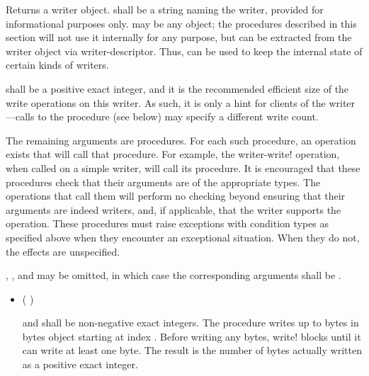 \begin{entry}{%
}
   
Returns a writer object.  shall be a string naming the writer,
provided for informational purposes only.  may be any
object; the procedures described in this section will not use it internally for any
purpose, but  can be extracted from the writer object via
{\cf writer-descriptor}. Thus,  can be used to keep the
internal state of certain kinds of writers.

 shall be a positive exact integer, and it is the
recommended efficient size of the write operations on this writer. As
such, it is only a hint for clients of the writer---calls to the
 procedure (see below) may specify a different write
count.

The remaining arguments are procedures.  For each such procedure, an
operation exists that will call that procedure.  For example, the {\cf
  writer-write!} operation, when called on a simple writer, will call
its  procedure.
It is encouraged that these procedures check that their arguments are
of the appropriate types.  The operations that call them will perform
no checking beyond ensuring that their  arguments are
indeed writers, and, if applicable, that the writer supports the operation.
These procedures must raise
exceptions with condition types as specified above when they encounter an
exceptional situation. When they do not, the effects are unspecified.

, , and  may be
omitted, in which case the corresponding arguments shall be \schfalse.

\begin{itemize}
\item {\cf (   )}
   
   and  shall be non-negative exact integers.
  The  procedure
  writes up to  bytes in bytes object 
  starting at index . Before writing any bytes, {\cf write!} blocks
  until it can write at least one byte. The result is the number of bytes
  actually written as a positive exact integer.
  

\end{itemize}
\end{entry}
